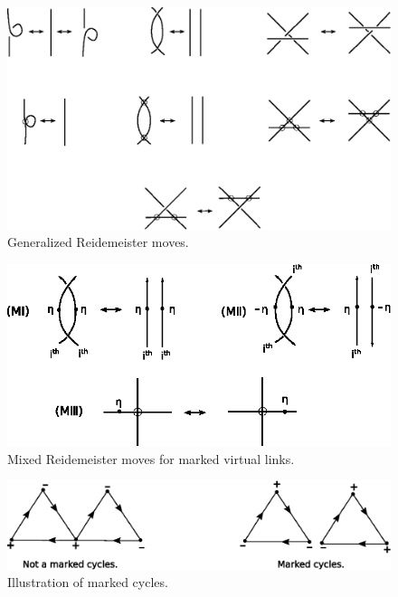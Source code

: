 \documentclass[11 pt, reqno]{amsart}
\theoremstyle{definition}
\numberwithin{equation}{subsection}
\begin{document}
\begin{figure}[H]
\includegraphics{CVReidMoves-1.eps}
\caption{Generalized Reidemeister moves.} \label{F: CVReidMoves}
\end{figure}

\begin{figure}[H]
\includegraphics{MixedReidMoves-1.eps}
\caption{Mixed Reidemeister moves for marked virtual links.}\label{F: MixedReidMoves}
\end{figure}

\begin{figure}[H]
\includegraphics[width=12cm]{graphs.eps}
\caption{Illustration of marked cycles.}\label{F: Illustration of marked cycles}
\end{figure}
\end{document}
